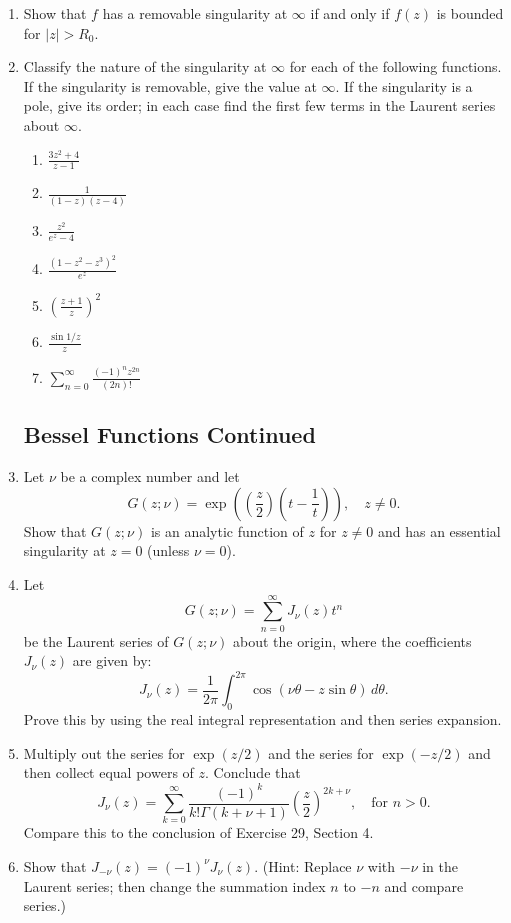 \documentclass[12pt]{article}
\theoremstyle{definition} %
\theoremstyle{plain} %
\begin{document}
\begin{enumerate}
\item Show that $f$ has a removable singularity at $\infty$ if and only if $f(z)$ is bounded for $|z| > R_0$.

\item Classify the nature of the singularity at $\infty$ for each of the following functions. If the singularity is removable, give the value at $\infty$. If the singularity is a pole, give its order; in each case find the first few terms in the Laurent series about $\infty$.
\begin{enumerate}
    \item $\frac{3z^2 + 4}{z - 1}$
    \item $\frac{1}{(1 - z)(z - 4)}$
    \item $\frac{z^2}{e^z - 4}$
    \item $\frac{(1 - z^2 - z^3)^2}{e^z}$
    \item $\left( \frac{z + 1}{z} \right)^2$
    \item $\frac{\sin 1/z}{z}$
    \item $\sum_{n=0}^\infty \frac{(-1)^n z^{2n}}{(2n)!}$
\end{enumerate}

\subsection*{Bessel Functions Continued}

\item Let $\nu$ be a complex number and let
\[
G(z; \nu) = \exp\left( \left( \frac{z}{2} \right) \left( t - \frac{1}{t} \right) \right), \quad z \ne 0.
\]
Show that $G(z; \nu)$ is an analytic function of $z$ for $z \ne 0$ and has an essential singularity at $z = 0$ (unless $\nu = 0$).

\item Let
\[
G(z; \nu) = \sum_{n=0}^\infty J_\nu(z) t^n
\]
be the Laurent series of $G(z; \nu)$ about the origin, where the coefficients $J_\nu(z)$ are given by:
\[
J_\nu(z) = \frac{1}{2\pi} \int_0^{2\pi} \cos(\nu \theta - z \sin \theta) \, d\theta.
\]
Prove this by using the real integral representation and then series expansion.

\item Multiply out the series for $\exp(z/2)$ and the series for $\exp(-z/2)$ and then collect equal powers of $z$. Conclude that
\[
J_\nu(z) = \sum_{k=0}^\infty \frac{(-1)^k}{k! \Gamma(k + \nu + 1)} \left( \frac{z}{2} \right)^{2k + \nu}, \quad \text{for } n > 0.
\]
Compare this to the conclusion of Exercise 29, Section 4.

\item Show that $J_{-\nu}(z) = (-1)^\nu J_\nu(z)$. (Hint: Replace $\nu$ with $-\nu$ in the Laurent series; then change the summation index $n$ to $-n$ and compare series.)
\end{enumerate}
\end{document}
